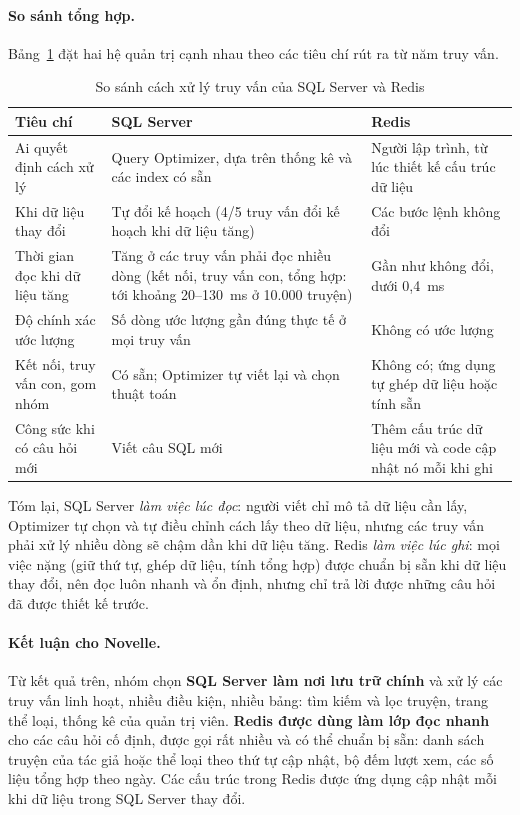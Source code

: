 \paragraph{So sánh tổng hợp.}
Bảng~\ref{tab:qp-compare} đặt hai hệ quản trị cạnh nhau theo các tiêu chí rút ra từ năm truy vấn.

\begin{table}[H]
    \centering
    \caption{So sánh cách xử lý truy vấn của SQL Server và Redis}
    \label{tab:qp-compare}
    \begin{tabularx}{\textwidth}{>{\raggedright\arraybackslash}p{3.4cm} X X}
        \toprule
        \textbf{Tiêu chí} & \textbf{SQL Server} & \textbf{Redis} \\
        \midrule
        Ai quyết định cách xử lý & Query Optimizer, dựa trên thống kê và các index có sẵn & Người lập trình, từ lúc thiết kế cấu trúc dữ liệu \\
        \addlinespace
        Khi dữ liệu thay đổi & Tự đổi kế hoạch (4/5 truy vấn đổi kế hoạch khi dữ liệu tăng) & Các bước lệnh không đổi \\
        \addlinespace
        Thời gian đọc khi dữ liệu tăng & Tăng ở các truy vấn phải đọc nhiều dòng (kết nối, truy vấn con, tổng hợp: tới khoảng 20--130~ms ở 10.000 truyện) & Gần như không đổi, dưới 0,4~ms \\
        \addlinespace
        Độ chính xác ước lượng & Số dòng ước lượng gần đúng thực tế ở mọi truy vấn & Không có ước lượng \\
        \addlinespace
        Kết nối, truy vấn con, gom nhóm & Có sẵn; Optimizer tự viết lại và chọn thuật toán & Không có; ứng dụng tự ghép dữ liệu hoặc tính sẵn \\
        \addlinespace
        Công sức khi có câu hỏi mới & Viết câu SQL mới & Thêm cấu trúc dữ liệu mới và code cập nhật nó mỗi khi ghi \\
        \bottomrule
    \end{tabularx}
\end{table}

Tóm lại, SQL Server \textit{làm việc lúc đọc}: người viết chỉ mô tả dữ liệu cần lấy, Optimizer tự chọn và tự điều chỉnh cách lấy theo dữ liệu, nhưng các truy vấn phải xử lý nhiều dòng sẽ chậm dần khi dữ liệu tăng. Redis \textit{làm việc lúc ghi}: mọi việc nặng (giữ thứ tự, ghép dữ liệu, tính tổng hợp) được chuẩn bị sẵn khi dữ liệu thay đổi, nên đọc luôn nhanh và ổn định, nhưng chỉ trả lời được những câu hỏi đã được thiết kế trước.

\paragraph{Kết luận cho Novelle.}
Từ kết quả trên, nhóm chọn \textbf{SQL Server làm nơi lưu trữ chính} và xử lý các truy vấn linh hoạt, nhiều điều kiện, nhiều bảng: tìm kiếm và lọc truyện, trang thể loại, thống kê của quản trị viên. \textbf{Redis được dùng làm lớp đọc nhanh} cho các câu hỏi cố định, được gọi rất nhiều và có thể chuẩn bị sẵn: danh sách truyện của tác giả hoặc thể loại theo thứ tự cập nhật, bộ đếm lượt xem, các số liệu tổng hợp theo ngày. Các cấu trúc trong Redis được ứng dụng cập nhật mỗi khi dữ liệu trong SQL Server thay đổi.

